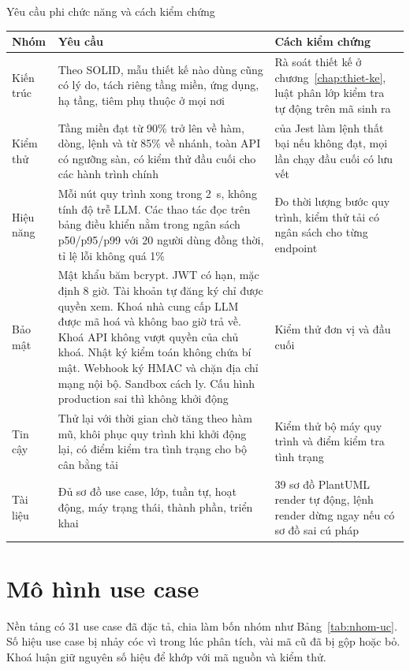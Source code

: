 \begin{table}{Yêu cầu phi chức năng và cách kiểm chứng}
\label{tab:nfr}
\small
\begin{tabularx}{\textwidth}{|P{2cm}|L|P{4.2cm}|}
\hline
\textbf{Nhóm} & \textbf{Yêu cầu} & \textbf{Cách kiểm chứng} \\ \hline
Kiến trúc & Theo SOLID, mẫu thiết kế nào dùng cũng có lý do, tách riêng tầng miền, ứng dụng, hạ tầng, tiêm phụ thuộc ở mọi nơi & Rà soát thiết kế ở chương~\ref{chap:thiet-ke}, luật phân lớp kiểm tra tự động trên mã sinh ra \\ \hline
Kiểm thử & Tầng miền đạt từ 90\% trở lên về hàm, dòng, lệnh và từ 85\% về nhánh, toàn API có ngưỡng sàn, có kiểm thử đầu cuối cho các hành trình chính &  của Jest làm lệnh  thất bại nếu không đạt, mọi lần chạy đầu cuối có lưu vết \\ \hline
Hiệu năng & Mỗi nút quy trình xong trong 2~s, không tính độ trễ LLM. Các thao tác đọc trên bảng điều khiển nằm trong ngân sách p50/p95/p99 với 20 người dùng đồng thời, tỉ lệ lỗi không quá 1\% & Đo thời lượng bước quy trình, kiểm thử tải có ngân sách cho từng endpoint \\ \hline
Bảo mật & Mật khẩu băm bcrypt. JWT có hạn, mặc định 8 giờ. Tài khoản tự đăng ký chỉ được quyền xem. Khoá nhà cung cấp LLM được mã hoá và không bao giờ trả về. Khoá API không vượt quyền của chủ khoá. Nhật ký kiểm toán không chứa bí mật. Webhook ký HMAC và chặn địa chỉ mạng nội bộ. Sandbox cách ly. Cấu hình production sai thì không khởi động & Kiểm thử đơn vị và đầu cuối \\ \hline
Tin cậy & Thử lại với thời gian chờ tăng theo hàm mũ, khôi phục quy trình khi khởi động lại, có điểm kiểm tra tình trạng cho bộ cân bằng tải & Kiểm thử bộ máy quy trình và điểm kiểm tra tình trạng \\ \hline
Tài liệu & Đủ sơ đồ use case, lớp, tuần tự, hoạt động, máy trạng thái, thành phần, triển khai & 39 sơ đồ PlantUML render tự động, lệnh render dừng ngay nếu có sơ đồ sai cú pháp \\ \hline
\end{tabularx}
\end{table}

\section{Mô hình use case}

Nền tảng có 31 use case đã đặc tả, chia làm bốn nhóm như Bảng~\ref{tab:nhom-uc}. Số hiệu use case bị nhảy cóc vì trong lúc phân tích, vài mã cũ đã bị gộp hoặc bỏ. Khoá luận giữ nguyên số hiệu để khớp với mã nguồn và kiểm thử.

